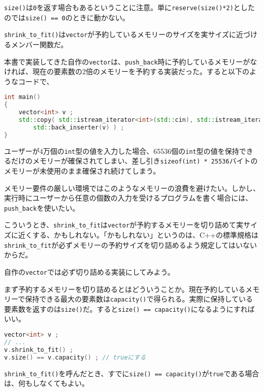 \texttt{size()}は\texttt{0}を返す場合もあるということに注意。単に\texttt{reserve(size()*2)}としたのでは\texttt{size() == 0}のときに動かない。


\texttt{shrink\_to\_fit()}は\texttt{vector}が予約しているメモリーのサイズを実サイズに近づけるメンバー関数だ。

本書で実装してきた自作の\texttt{vector}は、\texttt{push\_back}時に予約しているメモリーがなければ、現在の要素数の2倍のメモリーを予約する実装だった。すると以下のようなコードで、
\ifTombow\pagebreak\fi
\begin{lstlisting}[language={C++}]
int main()
{
    vector<int> v ;
    std::copy( std::istream_iterator<int>(std::cin), std::istream_iterator<int>(),
        std::back_inserter(v) ) ;
}
\end{lstlisting}
ユーザーが4万個の\texttt{int}型の値を入力した場合、65536個の\texttt{int}型の値を保持できるだけのメモリーが確保されてしまい、差し引き\texttt{sizeof(int) * 25536}バイトのメモリーが未使用のまま確保され続けてしまう。

メモリー要件の厳しい環境ではこのようなメモリーの浪費を避けたい。しかし、実行時にユーザーから任意の個数の入力を受けるプログラムを書く場合には、\texttt{push\_back}を使いたい。

こういうとき、\texttt{shrink\_to\_fit}は\texttt{vector}が予約するメモリーを切り詰めて実サイズに近くする、かもしれない。「かもしれない」というのは、C++の標準規格は\texttt{shrink\_to\_fit}が必ずメモリーの予約サイズを切り詰めるよう規定してはいないからだ。

自作の\texttt{vector}では必ず切り詰める実装にしてみよう。

まず予約するメモリーを切り詰めるとはどういうことか。現在予約しているメモリーで保持できる最大の要素数は\texttt{capacity()}で得られる。実際に保持している要素数を返すのは\texttt{size()}だ。すると\texttt{size() == capacity()}になるようにすればいい。

\begin{lstlisting}[language={C++}]
vector<int> v ;
// ...
v.shrink_to_fit() ;
v.size() == v.capacity() ; // trueにする
\end{lstlisting}

\texttt{shrink\_to\_fit()}を呼んだとき、すでに\texttt{size() == capacity()}が\texttt{true}である場合は、何もしなくてもよい。

